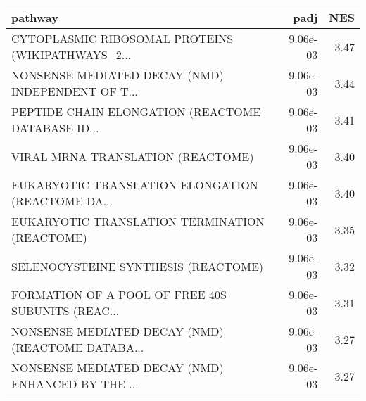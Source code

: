 \begin{tabular}{lrr}
\toprule
                                           pathway &      padj &   NES \\
\midrule
 CYTOPLASMIC RIBOSOMAL PROTEINS (WIKIPATHWAYS\_2... &  9.06e-03 &  3.47 \\
 NONSENSE MEDIATED DECAY (NMD) INDEPENDENT OF T... &  9.06e-03 &  3.44 \\
 PEPTIDE CHAIN ELONGATION (REACTOME DATABASE ID... &  9.06e-03 &  3.41 \\
                 VIRAL MRNA TRANSLATION (REACTOME) &  9.06e-03 &  3.40 \\
 EUKARYOTIC TRANSLATION ELONGATION (REACTOME DA... &  9.06e-03 &  3.40 \\
     EUKARYOTIC TRANSLATION TERMINATION (REACTOME) &  9.06e-03 &  3.35 \\
               SELENOCYSTEINE SYNTHESIS (REACTOME) &  9.06e-03 &  3.32 \\
 FORMATION OF A POOL OF FREE 40S SUBUNITS (REAC... &  9.06e-03 &  3.31 \\
 NONSENSE-MEDIATED DECAY (NMD) (REACTOME DATABA... &  9.06e-03 &  3.27 \\
 NONSENSE MEDIATED DECAY (NMD) ENHANCED BY THE ... &  9.06e-03 &  3.27 \\
\bottomrule
\end{tabular}
